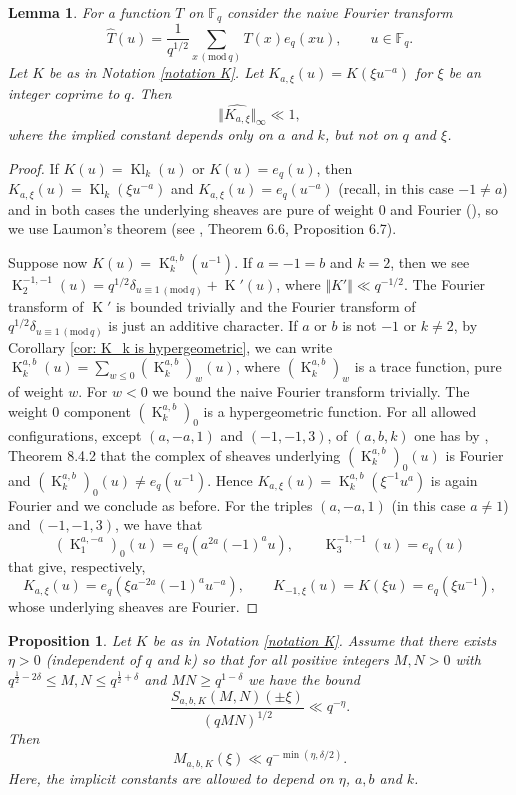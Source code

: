 \documentclass[12pt]{amsart}
\theoremstyle{plain}
\newtheorem{prop}[thm]{Proposition}
\newtheorem{lem}[thm]{Lemma}
\theoremstyle{definition}
\theoremstyle{remark}
\numberwithin{equation}{section}
\newcommand{\FF}{\mathbb{F}}
\newcommand{\mods}[1]{\,(\mathrm{mod}\,{#1})}
\renewcommand{\geq}{\geqslant}
\renewcommand{\leq}{\leqslant}
\DeclareMathOperator{\Kl}{Kl}%
\DeclareMathOperator{\K}{K} %
\begin{document}
\begin{lem}\label{lem: fourier}
    For a function $T$ on $\FF_q$ consider the naive Fourier transform 
    \[ \widehat{T}(u) = \frac{1}{q^{1/2}}\sum_{x\mods{q}}T(x) e_q(xu), \qquad u \in \FF_q.\]
    Let $K$ be as in Notation \ref{notation K}. 
    Let $K_{a,\xi}(u) = K(\xi u^{-a})$ for $\xi$ be an integer coprime to $q$. Then 
    \[ \Vert\widehat{K_{a,\xi}}\Vert_\infty  \ll 1, \]
    where the implied constant depends only on $a$ and $k$, but not on $q$ and $\xi$.
\end{lem}
\begin{proof}
    If $K(u)=\Kl_k(u)$ or $K(u) = e_q(u)$, then $K_{a,\xi}(u) = \Kl_k(\xi u^{-a})$ and $K_{a,\xi}(u) = e_q(u^{-a})$ (recall, in this case $-1 \neq a$) and in both cases the underlying sheaves are pure of weight $0$ and Fourier (\cite{Katz88}), so we use Laumon's theorem (see \cite{AppliedladicCohom}, Theorem 6.6, Proposition 6.7).
    
      Suppose now $K(u) = \K_k^{a,b}(u^{-1})$. If $a= -1 = b$ and $k=2$, then we see $\K_2^{-1,-1}(u) = q^{1/2}\delta_{u\equiv 1\mods{q}} + \K'(u)$, where $\Vert K' \Vert \ll q^{-1/2}$. The Fourier transform of $\K'$ is bounded trivially and the Fourier transform of $q^{1/2}\delta_{u\equiv 1\mods{q}}$ is just an additive character. If $a$ or $b$ is not $-1$ or $k\neq 2$, by Corollary \ref{cor: K_k is hypergeometric}, we can write $\K_k^{a,b}(u)  = \sum_{w \leq 0}(\K^{a,b}_k)_w(u)$, where $(\K^{a,b}_k)_w$ is a trace function, pure of weight $w$. For $w<0$ we bound the naive Fourier transform trivially.  The weight 0 component $(\K^{a,b}_k)_0$ is a hypergeometric function. For all allowed configurations, except $(a,-a,1)$ and $(-1,-1,3)$,  of $(a,b,k)$ one has by \cite{Katzbook}, Theorem 8.4.2 that the complex of sheaves underlying $(\K^{a,b}_k)_0(u)$ is Fourier and $(\K^{a,b}_k)_0(u) \neq e_q(u^{-1})$. Hence $K_{a,\xi}(u) = \K_k^{a,b}(\xi^{-1} u^{a})$ is again Fourier and we conclude as before. 
    For the triples $(a,-a,1)$ (in this case $a\neq 1$) and $(-1,-1,3)$, we have that  $$(\K_1^{a,-a})_0(u)=e_q(a^{2a}(-1)^au),\qquad \K_{3}^{-1,-1}(u)=e_q(u)$$ that give, respectively,
    $$ K_{a,\xi}(u) = e_q(\xi a^{-2a}(-1)^au^{-a}), \qquad K_{-1,\xi}(u) = K(\xi u)= e_q(\xi u^{-1}), $$
    whose underlying sheaves are Fourier. 
   
    
\end{proof}


\begin{prop}\label{prop main under condition}Let $K$ be as in Notation \ref{notation K}. 
Assume that there exists $\eta >0$ (independent of $q$ and $k$) so that for all positive integers $M,N>0$ with $q^{\frac 12-2\delta}\leq M,N\leq q^{\frac 12+\delta}$ and $MN\geq q^{1-\delta}$ we have the bound
\begin{equation}\label{eq:desideratakloosterman}\frac{S_{a,b,K}(M,N)(\pm \xi)}{(qMN)^{1/2}} \ll q^{-\eta}. \end{equation}
 Then 
    $$M_{a,b,K}(\xi) \ll q^{-\min(\eta,\delta/2)}.$$
Here, the implicit constants are allowed to depend on $\eta$, $a,b$ and $k$.
\end{prop}
\end{document}
